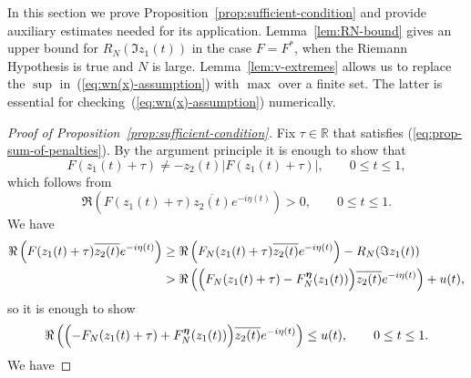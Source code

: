 \documentclass[oneside,english]{amsart}
\numberwithin{equation}{section}
\numberwithin{figure}{section}
\theoremstyle{plain}
\theoremstyle{plain}
\theoremstyle{plain}
\theoremstyle{definition}
\begin{document}
In this section we prove Proposition~\ref{prop:sufficient-condition}
and provide auxiliary estimates needed for its application. Lemma~\ref{lem:RN-bound}
gives an upper bound for $R_{N}(\Im z_{1}(t))$ in the case $F=F^{*}$,
when the Riemann Hypothesis is true and $N$ is large. Lemma~\ref{lem:v-extremes}
allows us to replace the $\sup$ in~(\ref{eq:wn(x)-assumption})
with $\max$ over a finite set. The latter is essential for checking~(\ref{eq:wn(x)-assumption})
numerically.
\begin{proof}[Proof of Proposition~\ref{prop:sufficient-condition}]
Fix $\tau\in\mathbb{R}$ that satisfies (\ref{eq:prop-sum-of-penalties}).
By the argument principle it is enough to show that 
\[
F(z_{1}(t)+\tau)\neq-z_{2}(t)\left|F(z_{1}(t)+\tau)\right|,\qquad0\leq t\leq1,
\]
which follows from
\[
\Re\left(F(z_{1}(t)+\tau)\overline{z_{2}(t)}e^{-i\eta(t)}\right)>0,\qquad0\leq t\leq1.
\]
We have
\begin{align*}
\Re\left(F(z_{1}(t)+\tau)\overline{z_{2}(t)}e^{-i\eta(t)}\right) & \geq\Re\left(F_{N}(z_{1}(t)+\tau)\overline{z_{2}(t)}e^{-i\eta(t)}\right)-R_{N}(\Im z_{1}(t))\\
 & >\Re\left(\Bigl(F_{N}(z_{1}(t)+\tau)-F_{N}^{\boldsymbol{\eta}}(z_{1}(t))\Bigr)\overline{z_{2}(t)}e^{-i\eta(t)}\right)+u(t),
\end{align*}
so it is enough to show
\begin{equation}
\Re\left(\Bigl(-F_{N}(z_{1}(t)+\tau)+F_{N}^{\boldsymbol{\eta}}(z_{1}(t))\Bigr)\overline{z_{2}(t)}e^{-i\eta(t)}\right)\leq u(t),\qquad0\leq t\leq1.\label{eq:sufficient-condition-u(t)}
\end{equation}
We have


\end{proof}
\end{document}
